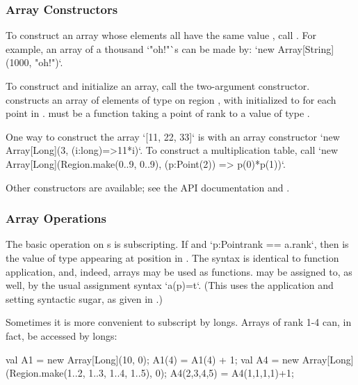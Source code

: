 \subsubsection{Array Constructors}

To construct an array whose elements all have the same value , call
. 
For example, an array of a thousand \xcd`"oh!"`s can be made by:
\xcd`new Array[String](1000, "oh!")`.


To construct and initialize an array, call the two-argument constructor. 
 constructs an array of elements of type  on
region , with  initialized to  for each point
 in .   must be a function taking a point of rank
 to a value of type .  

\begin{ex}
One way to construct the array \xcd`[11, 22, 33]` is with an array constructor
\xcd`new Array[Long](3, (i:long)=>11*i)`. 
To construct a multiplication table, call
\xcd`new Array[Long](Region.make(0..9, 0..9), (p:Point(2)) => p(0)*p(1))`.
\end{ex}

Other constructors are available; see the API documentation and
. 

\subsubsection{Array Operations}

The basic operation on s is subscripting.  If  and 
\xcd`p:Point{rank == a.rank}`, then  is the value of type 
appearing at position  in .    The syntax is identical to
function application, and, indeed, arrays may be used as functions.
 may be assigned to, as well, by the usual assignment syntax
\xcd`a(p)=t`.
(This uses the application and setting syntactic sugar, as given in .)

Sometimes it is more convenient to subscript by longs.  Arrays of rank 1-4
can, in fact, be accessed by longs: 
\begin{xten}
val A1 = new Array[Long](10, 0);
A1(4) = A1(4) + 1;
val A4 = new Array[Long](Region.make(1..2, 1..3, 1..4, 1..5), 0);
A4(2,3,4,5) = A4(1,1,1,1)+1;
\end{xten}



